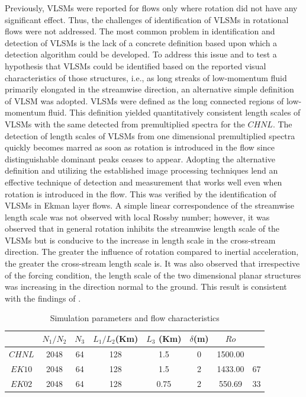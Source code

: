 Previously, VLSMs were reported for flows only where rotation did not have any significant effect. Thus, the challenges of identification of VLSMs in rotational flows were not addressed. The most common problem in identification and detection of VLSMs is the lack of a concrete definition based upon which a detection algorithm could be developed. To address this issue and to test a hypothesis that VLSMs could be identified based on the reported visual characteristics of those structures, i.e., as long streaks of low-momentum fluid primarily elongated in the streamwise direction, an alternative simple definition of VLSM was adopted. VLSMs were defined as the long connected regions of low-momentum fluid. This definition yielded quantitatively consistent length scales of VLSMs with the same detected from premultiplied spectra for the $CHNL$. The detection of length scales of VLSMs from one dimensional premultiplied spectra quickly becomes marred as soon as rotation is introduced in the flow since distinguishable dominant peaks ceases to appear. Adopting the alternative definition and utilizing the established image processing techniques lend an effective technique of detection and measurement that works well even when rotation is introduced in the flow. This was verified by the identification of VLSMs in Ekman layer flows. A simple linear correspondence of the streamwise length scale was not observed with local Rossby number; however, it was observed that in general rotation inhibits the streamwise length scale of the VLSMs but is conducive to the increase in length scale in the cross-stream direction. The greater the influence of rotation compared to inertial acceleration, the greater the cross-stream length scale is. It was also observed that irrespective of the forcing condition, the length scale of the two dimensional planar structures was increasing in the direction normal to the ground. This result is consistent with the findings of  \citet{de_silva_hutchins_jfm_2016}.  



\clearpage

\begin{table}
	\caption{Simulation parameters and flow characteristics}
	\centering
	\begin{tabular}{ c c c c c c c c}
		\hline 
		       & $N_1/N_2$ & $N_3$ & $L_1/L_2$(Km)  & $L_3$ (Km) & $\delta$(m)   & $Ro$ \\
		\hline  
		$CHNL$ & 2048      &  64   & 128            &  1.5 & 0   & 1500.00       &     \\
		$EK10$ & 2048      &  64   & 128            &  1.5 & 2   & 1433.00       & 67   \\
		$EK02$ & 2048      &  64   & 128            &  0.75 & 2  & 550.69        & 33  \\
		\hline 
		\hline 
	\end{tabular}
	\label{tab:sim_param}
\end{table}

